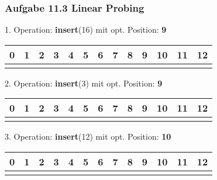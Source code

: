\documentclass{beamer}
\begin{document}
\begin{frame}
	\frametitle{Aufgabe 11.3 Linear Probing}
	1. Operation: \textbf{insert}(16) mit opt. Position: \textbf{9}
	\begin{table}
		\centering
		\begin{tabular}{c|c|c|c|c|c|c|c|c|c|c|c|c}
			0 & 1 & 2 & 3 & 4 & 5 & 6 & 7 & 8 & 9 & 10 & 11 & 12 \\
			\hline
			  &   &   &   &   &   &   &   &   &   &    &    &    \\
		\end{tabular}
	\end{table}

	2. Operation: \textbf{insert}(3) mit opt. Position: \textbf{9}
	\begin{table}
		\centering
		\begin{tabular}{c|c|c|c|c|c|c|c|c|c|c|c|c}
			0 & 1 & 2 & 3 & 4 & 5 & 6 & 7 & 8 & 9 & 10 & 11 & 12 \\
			\hline
			  &   &   &   &   &   &   &   &   &   &    &    &    \\
		\end{tabular}
	\end{table}

	3. Operation: \textbf{insert}(12) mit opt. Position: \textbf{10}
	\begin{table}
		\centering
		\begin{tabular}{c|c|c|c|c|c|c|c|c|c|c|c|c}
			0 & 1 & 2 & 3 & 4 & 5 & 6 & 7 & 8 & 9 & 10 & 11 & 12 \\
			\hline
			  &   &   &   &   &   &   &   &   &   &    &    &    \\
		\end{tabular}
	\end{table}
\end{frame}
\end{document}
